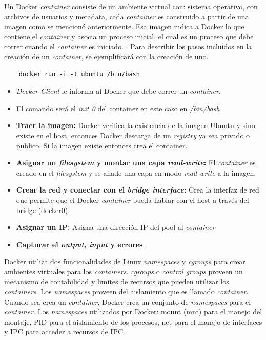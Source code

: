 Un Docker \textit{container} consiste de  un ambiente virtual con: sistema operativo, con archivos de usuarios y metadata, cada \textit{container} es construido a partir de una imagen como se mencionó anteriormente. Esa imagen indica a Docker lo que contiene el \textit{container} y asocia un proceso inicial, el cual es un proceso que debe correr cuando el  \textit{container} es iniciado. \cite{Docker:2015:understanding}. Para describir los pasos incluidos en la creación de un \emph{container}, se ejemplificará con la creación de uno.

\begin{verbatim}
	docker run -i -t ubuntu /bin/bash
\end{verbatim}
	\begin{itemize}
		\item \emph{Docker Client} le informa al Docker que debe correr un \emph{container}.
		\item El comando será el \textit{init 0} del container en este caso en \emph{/bin/bash}
		\item \textbf{Traer la imagen:} Docker verifica la existencia de la imagen Ubuntu y sino existe en el host, entonces Docker descarga de un \textit{registry} ya sea privado o publico. Si la imagen existe entonces crea el container.
		\item \textbf{Asignar un \emph{filesystem} y montar una capa \emph{read-write}:} El 
			\textit{container} es creado en el \emph{filesystem} y se añade una capa en modo 
			\emph{read-write} a la imagen.
		\item \textbf{Crear la red y conectar con el \emph{bridge interface}:} Crea la interfaz de red que permite que el Docker \textit{container} pueda hablar con el host a través del bridge (docker0).
		\item \textbf{Asignar un IP:} Asigna una dirección IP del pool al \textit{container}
		\item \textbf{Capturar el \emph{output}, \emph{input} y errores}.
	\end{itemize}

Docker utiliza dos funcionalidades de Linux \emph{namespaces} y \emph{cgroups} para crear ambientes virtuales para los \textit{containers}. \emph{cgroups} o \emph{control groups} proveen un mecanismo de contabilidad y limites de recursos que pueden utilizar los \textit{containers}\cite{bui2015analysis}. Los \emph{namespaces} proveen del aislamiento que es llamado \textit{container}. Cuando sea crea un \textit{container}, Docker crea un conjunto de \emph{namespaces} para el \textit{container}. Los \emph{namespaces} utilizados por Docker: mount (mnt) para el manejo del montaje, PID para el aislamiento de los procesos, net para el manejo de interfaces y IPC para acceder a recursos de IPC. 

